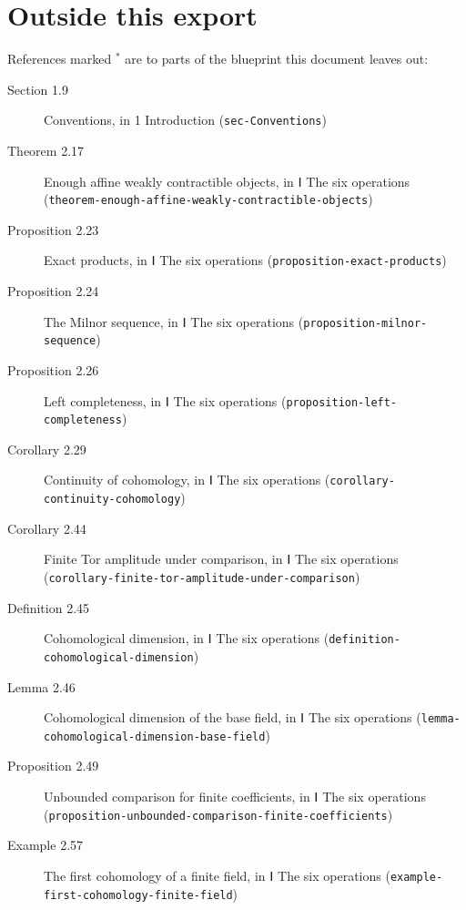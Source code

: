 \documentclass[11pt]{article}
\newcommand{\bpslug}[1]{\texttt{#1}}
\begin{document}
\section*{Outside this export}
References marked \ensuremath{{}^\ast} are to parts of the blueprint this document leaves out:
\begin{description}
\item[Section 1.9] Conventions, in 1 Introduction (\bpslug{sec-{}\allowbreak{}Conventions})
\item[Theorem 2.17] Enough affine weakly contractible objects, in Ⅰ The six operations (\bpslug{theorem-{}\allowbreak{}enough-{}\allowbreak{}affine-{}\allowbreak{}weakly-{}\allowbreak{}contractible-{}\allowbreak{}objects})
\item[Proposition 2.23] Exact products, in Ⅰ The six operations (\bpslug{proposition-{}\allowbreak{}exact-{}\allowbreak{}products})
\item[Proposition 2.24] The Milnor sequence, in Ⅰ The six operations (\bpslug{proposition-{}\allowbreak{}milnor-{}\allowbreak{}sequence})
\item[Proposition 2.26] Left completeness, in Ⅰ The six operations (\bpslug{proposition-{}\allowbreak{}left-{}\allowbreak{}completeness})
\item[Corollary 2.29] Continuity of cohomology, in Ⅰ The six operations (\bpslug{corollary-{}\allowbreak{}continuity-{}\allowbreak{}cohomology})
\item[Corollary 2.44] Finite Tor amplitude under comparison, in Ⅰ The six operations (\bpslug{corollary-{}\allowbreak{}finite-{}\allowbreak{}tor-{}\allowbreak{}amplitude-{}\allowbreak{}under-{}\allowbreak{}comparison})
\item[Definition 2.45] Cohomological dimension, in Ⅰ The six operations (\bpslug{definition-{}\allowbreak{}cohomological-{}\allowbreak{}dimension})
\item[Lemma 2.46] Cohomological dimension of the base field, in Ⅰ The six operations (\bpslug{lemma-{}\allowbreak{}cohomological-{}\allowbreak{}dimension-{}\allowbreak{}base-{}\allowbreak{}field})
\item[Proposition 2.49] Unbounded comparison for finite coefficients, in Ⅰ The six operations (\bpslug{proposition-{}\allowbreak{}unbounded-{}\allowbreak{}comparison-{}\allowbreak{}finite-{}\allowbreak{}coefficients})
\item[Example 2.57] The first cohomology of a finite field, in Ⅰ The six operations (\bpslug{example-{}\allowbreak{}first-{}\allowbreak{}cohomology-{}\allowbreak{}finite-{}\allowbreak{}field})

\end{description}
\end{document}
